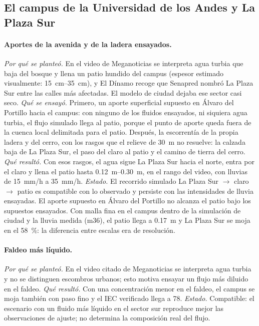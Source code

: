 \subsection{El campus de la Universidad de los Andes y La Plaza Sur}
\paragraph{Aportes de la avenida y de la ladera ensayados.} \emph{Por qué se planteó.} En el video de Meganoticias se interpreta agua turbia que baja del bosque y llena un patio hundido del campus (espesor estimado visualmente: \SIrange{15}{35}{cm}), y El Dínamo recoge que Senapred nombró La Plaza Sur entre las calles más afectadas. El modelo de ciudad dejaba ese sector casi seco. \emph{Qué se ensayó.} Primero, un aporte superficial supuesto en Álvaro del Portillo hacia el campus: con ninguno de los fluidos ensayados, ni siquiera agua turbia, el flujo simulado llega al patio, porque el punto de aporte queda fuera de la cuenca local delimitada para el patio. Después, la escorrentía de la propia ladera y del cerro, con los rasgos que el relieve de \SI{30}{m} no resuelve: la calzada baja de La Plaza Sur, el paso del claro al patio y el camino de tierra del cerro. \emph{Qué resultó.} Con esos rasgos, el agua sigue La Plaza Sur hacia el norte, entra por el claro y llena el patio hasta \SIrange{0,12}{0,30}{m}, en el rango del video, con lluvias de \SI{15}{mm/h} a \SI{35}{mm/h}. \emph{Estado.} El recorrido simulado La Plaza Sur $\rightarrow$ claro $\rightarrow$ patio es compatible con lo observado y persiste con las intensidades de lluvia ensayadas. El aporte supuesto en Álvaro del Portillo no alcanza el patio bajo los supuestos ensayados. Con malla fina en el campus dentro de la simulación de ciudad y la lluvia medida (m36), el patio llega a \SI{0,17}{m} y La Plaza Sur se moja en el \SI{58}{\percent}: la diferencia entre escalas era de resolución.

\paragraph{Faldeo más líquido.} \emph{Por qué se planteó.} En el video citado de Meganoticias se interpreta agua turbia y no se distinguen escombros urbanos; esto motiva ensayar un flujo más diluido en el faldeo. \emph{Qué resultó.} Con una concentración menor en el faldeo, el campus se moja también con paso fino y el IEC verificado llega a 78. \emph{Estado.} Compatible: el escenario con un fluido más líquido en el sector sur reproduce mejor las observaciones de ajuste; no determina la composición real del flujo.


